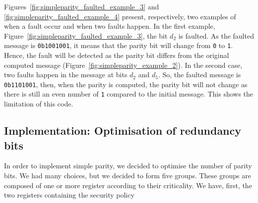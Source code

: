 Figures~\ref{fig:simpleparity_faulted_example_3} and \ref{fig:simpleparity_faulted_example_4} present, respectively, two examples of when a fault occur and when two faults happen.
In the first example, Figure~\ref{fig:simpleparity_faulted_example_3}, the bit $d_2$ is faulted. As the faulted message is \texttt{0b1001001}, it means that the parity bit will change from \texttt{0} to \texttt{1}. Hence, the fault will be detected as the parity bit differs from the original computed message (Figure~\ref{fig:simpleparity_example_2}).
In the second case, two faults happen in the message at bits $d_2$ and $d_5$. So, the faulted message is \texttt{0b1101001}, then, when the parity is computed, the parity bit will not change as there is still an even number of \texttt{1} compared to the initial message. This shows the limitation of this code.

\subsection{Implementation: Optimisation of redundancy bits}

In order to implement simple parity, we decided to optimise the number of parity bits. We had many choices, but we decided to form five groups. These groups are composed of one or more register according to their criticality. We have, first, the two registers containing the security policy

